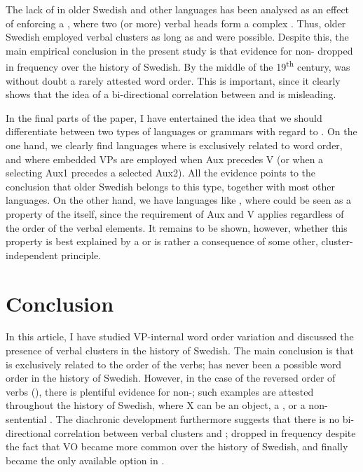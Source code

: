 \documentclass[output=paper, colorlinks, citecolor=brown]{langscibook}
\begin{document}
The lack of  in older Swedish and other languages has been analysed as an effect of  enforcing a , where two (or more) verbal heads form a complex . Thus, older Swedish employed verbal clusters as long as  and  were possible. Despite this, the main empirical conclusion in the present study is that evidence for non- dropped in frequency over the history of Swedish. By the middle of the 19\textsuperscript{th} century,  was without doubt a rarely attested word order. This is important, since it clearly shows that the idea of a bi-directional correlation between  and  is misleading.



In the final parts of the paper, I have entertained the idea that we should differentiate between two types of languages or grammars with regard to . On the one hand, we clearly find languages where  is exclusively related to  word order, and where embedded VPs are employed when Aux precedes V (or when a selecting  Aux1 precedes a selected  Aux2). All the evidence points to the conclusion that older Swedish belongs to this type, together with most other  languages. On the other hand, we have languages like , where  could be seen as a property of the  itself, since the  requirement of Aux and V applies regardless of the order of the verbal elements. It remains to be shown, however, whether this property is best explained by a  or is rather a consequence of some other, cluster-independent principle.


\section{Conclusion}\label{sec:sangfelt:6}

In this article, I have studied VP-internal word order variation and discussed the presence of verbal clusters in the history of Swedish. The main conclusion is that  is exclusively related to the order of the verbs;  has never been a possible word order in the history of Swedish. However, in the case of the reversed order of verbs (), there is plentiful evidence for non-; such examples are attested throughout the history of Swedish, where X can be an object, a , or a non-sentential . The diachronic development furthermore suggests that there is no bi-directional correlation between verbal clusters and ;  dropped in frequency despite the fact that VO became more common over the history of Swedish, and finally became the only available option in .
\end{document}
